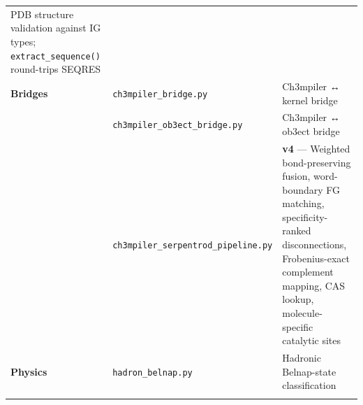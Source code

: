 \begin{longtable}[]{@{}lll@{}}
\begin{minipage}[t]{0.42\columnwidth}
PDB structure validation against IG types; \texttt{extract\_sequence()}
round-trips SEQRES\strut
\end{minipage}\tabularnewline
\begin{minipage}[t]{0.23\columnwidth}\raggedright
\textbf{Bridges}\strut
\end{minipage} & \begin{minipage}[t]{0.26\columnwidth}\raggedright
\texttt{ch3mpiler\_bridge.py}\strut
\end{minipage} & \begin{minipage}[t]{0.42\columnwidth}\raggedright
Ch3mpiler ↔ kernel bridge\strut
\end{minipage}\tabularnewline
\begin{minipage}[t]{0.23\columnwidth}\raggedright
\strut
\end{minipage} & \begin{minipage}[t]{0.26\columnwidth}\raggedright
\texttt{ch3mpiler\_ob3ect\_bridge.py}\strut
\end{minipage} & \begin{minipage}[t]{0.42\columnwidth}\raggedright
Ch3mpiler ↔ ob3ect bridge\strut
\end{minipage}\tabularnewline
\begin{minipage}[t]{0.23\columnwidth}\raggedright
\strut
\end{minipage} & \begin{minipage}[t]{0.26\columnwidth}\raggedright
\texttt{ch3mpiler\_serpentrod\_pipeline.py}\strut
\end{minipage} & \begin{minipage}[t]{0.42\columnwidth}\raggedright
\textbf{v4} --- Weighted bond-preserving fusion, word-boundary FG
matching, specificity-ranked disconnections, Frobenius-exact complement
mapping, CAS lookup, molecule-specific catalytic sites\strut
\end{minipage}\tabularnewline
\begin{minipage}[t]{0.23\columnwidth}\raggedright
\textbf{Physics}\strut
\end{minipage} & \begin{minipage}[t]{0.26\columnwidth}\raggedright
\texttt{hadron\_belnap.py}\strut
\end{minipage} & \begin{minipage}[t]{0.42\columnwidth}\raggedright
Hadronic Belnap-state classification\strut
\end{minipage}\tabularnewline
\begin{minipage}[t]{0.23\columnwidth}\raggedright

\end{minipage}
\end{longtable}
